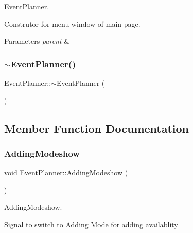 \hyperlink{class_event_planner}{Event\+Planner}. 

Construtor for menu window of main page. 
\begin{DoxyParams}{Parameters}
{\em parent} & \\
\hline
\end{DoxyParams}
\mbox{\label{class_event_planner_a0963c57038db491e25e7562a7701ae28}} 
\subsubsection{\texorpdfstring{$\sim$\+Event\+Planner()}{~EventPlanner()}}
{\footnotesize\ttfamily Event\+Planner\+::$\sim$\+Event\+Planner (\begin{DoxyParamCaption}{ }\end{DoxyParamCaption})}



\subsection{Member Function Documentation}
\mbox{\label{class_event_planner_ac29d7162ba23478a3ca83d9a3451317e}} 
\subsubsection{\texorpdfstring{Adding\+Modeshow}{AddingModeshow}}
{\footnotesize\ttfamily void Event\+Planner\+::\+Adding\+Modeshow (\begin{DoxyParamCaption}{ }\end{DoxyParamCaption})\hspace{0.3cm}{\ttfamily [signal]}}



Adding\+Modeshow. 

Signal to switch to Adding Mode for adding availablity \mbox{\label{class_event_planner_a11d013b57831e685d134d824db883ad3}} 

